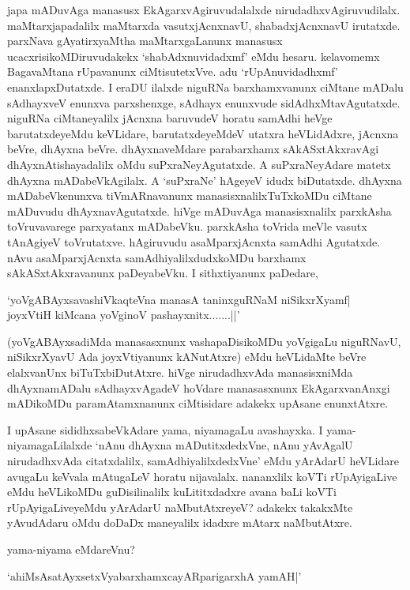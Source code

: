 japa mADuvAga manasusx EkAgarxvAgiruvudalalxde nirudadhxvAgiruvudilalx. maMtarxjapadalilx maMtarxda vasutxjAcnxnavU, shabadxjAcnxnavU irutatxde. parxNava gAyatirxyaMtha maMtarxgaLanunx manasusx ucacxrisikoMDiruvudakekx `shabAdxnuvidadxmf' eMdu hesaru. kelavomemx BagavaMtana rUpavanunx ciMtisutetxVve. adu `rUpAnuvidadhxmf' enanxlapxDutatxde. I eraDU ilalxde niguRNa barxhamxvanunx ciMtane mADalu sAdhayxveV enunxva parxshenxge, sAdhayx enunxvude sidAdhxMtavAgutatxde. niguRNa ciMtaneyalilx jAcnxna baruvudeV horatu samAdhi heVge barutatxdeyeMdu keVLidare, barutatxdeyeMdeV utatxra heVLidAdxre, jAcnxna beVre, dhAyxna beVre. dhAyxnaveMdare parabarxhamx sAkASxtAkxravAgi dhAyxnAtishayadalilx oMdu suPxraNeyAgutatxde. A suPxraNeyAdare matetx dhAyxna mADabeVkAgilalx. A `suPxraNe' hAgeyeV idudx biDutatxde. dhAyxna mADabeVkenunxva tiVmARnavanunx manasisxnalilxTuTxkoMDu ciMtane mADuvudu dhAyxnavAgutatxde. hiVge mADuvAga manasisxnalilx parxkAsha toVruvavarege parxyatanx mADabeVku. parxkAsha toVrida meVle vasutx tAnAgiyeV toVrutatxve. hAgiruvudu asaMparxjAcnxta samAdhi Agutatxde. nAvu asaMparxjAcnxta samAdhiyalilxdudxkoMDu barxhamx sAkASxtAkxravanunx paDeyabeVku. I sithxtiyanunx paDedare, 

\begin{shloka}
`yoVgABAyxsavashiVkaqteVna manasA taninxguRNaM niSikxrXyamf|\\
joyxVtiH kiMcana yoVginoV pashayxnitx.......||'
\end{shloka}

(yoVgABAyxsadiMda manasasxnunx vashapaDisikoMDu yoVgigaLu niguRNavU, niSikxrXyavU Ada joyxVtiyanunx kANutAtxre) eMdu heVLidaMte beVre elalxvanUnx biTuTxbiDutAtxre. hiVge nirudadhxvAda manasisxniMda dhAyxnamADalu sAdhayxvAgadeV hoVdare manasasxnunx EkAgarxvanAnxgi mADikoMDu paramAtamxnanunx ciMtisidare adakekx upAsane enunxtAtxre.

I upAsane sididhxsabeVkAdare yama, niyamagaLu avashayxka. I yama-niyamagaLilalxde `nAnu dhAyxna mADutitxdedxVne, nAnu yAvAgalU nirudadhxvAda citatxdalilx, samAdhiyalilxdedxVne' eMdu yArAdarU heVLidare avugaLu keVvala mAtugaLeV horatu nijavalalx. nananxlilx koVTi rUpAyigaLive eMdu heVLikoMDu guDisilinalilx kuLititxdadxre avana baLi koVTi rUpAyigaLiveyeMdu yArAdarU naMbutAtxreyeV? adakekx takakxMte yAvudAdaru oMdu doDaDx maneyalilx idadxre mAtarx naMbutAtxre.

yama-niyama eMdareVnu?

\begin{shloka}
`ahiMsAsatAyxsetxVyabarxhamxcayARparigarxhA yamAH|'
\end{shloka}


